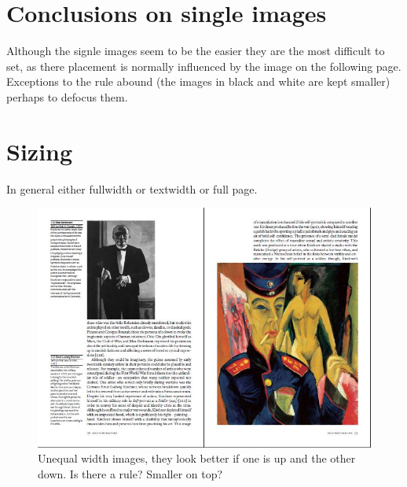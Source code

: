 \documentclass{book}
\renewcommand{\topfraction}{.95}
\begin{document}
\section{Conclusions on single images}
Although the signle images seem to be the easier they are the most difficult to set, as there placement is normally influenced by the image on the following page. Exceptions to the rule abound (the images in black and white are kept smaller) perhaps to defocus them.

\section{Sizing}
In general either fullwidth or textwidth or full page.

\renewcommand{\topfraction}{1}
\begin{figure}[bt]
  \hspace*{-\marginparwidth} \includegraphics[width=\dimexpr(\textwidth+\marginparwidth)]{2-unequal-02}
  \caption{Unequal width images, they look better if one is up and the other down. Is there a rule? Smaller on top?}
\end{figure}

\clearpage
\lipsum[1-5]
\end{document}
